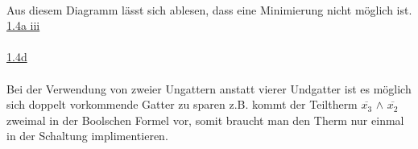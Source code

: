 \documentclass[a4paper,10pt]{scrartcl}
\begin{document}
\\
Aus diesem Diagramm lässt sich ablesen, dass eine Minimierung nicht möglich ist.
\newpage
\noindent
\underline{1.4a iii}\\\\
\underline{1.4d}\\\\
Bei der Verwendung von zweier Ungattern anstatt vierer Undgatter ist es möglich sich doppelt vorkommende Gatter zu sparen z.B. kommt der Teiltherm $\overline{x_{3}}$ $\land$ $\overline{x_{2}}$ zweimal in der Boolschen Formel vor, somit braucht man den Therm nur einmal in der Schaltung implimentieren.\\
\newpage
\noindent
{}
\end{document}
